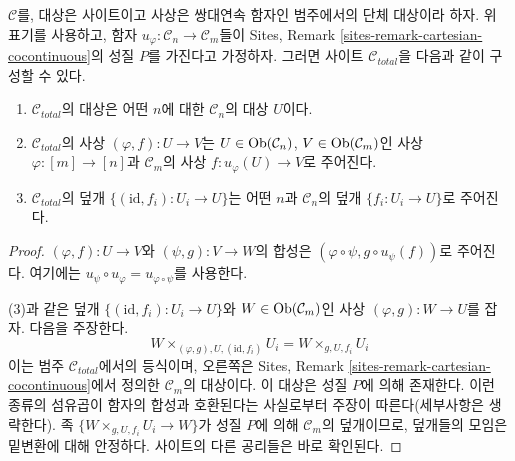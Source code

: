 \begin{lemma}
\label{lemma-simplicial-cocontinuous-site}
$\mathcal{C}$를, 대상은 사이트이고 사상은 쌍대연속 함자인 범주에서의
단체 대상이라 하자. 위 표기를 사용하고, 함자
$u_\varphi : \mathcal{C}_n \to \mathcal{C}_m$들이 Sites, Remark
\ref{sites-remark-cartesian-cocontinuous}의 성질 $P$를 가진다고 가정하자.
그러면 사이트 $\mathcal{C}_{total}$을 다음과 같이 구성할 수 있다.
\begin{enumerate}
\item $\mathcal{C}_{total}$의 대상은 어떤 $n$에 대한
$\mathcal{C}_n$의 대상 $U$이다.
\item $\mathcal{C}_{total}$의 사상
$(\varphi, f) : U \to V$는 $U \in \mathop{\mathrm{Ob}}\nolimits(\mathcal{C}_n)$,
$V \in \mathop{\mathrm{Ob}}\nolimits(\mathcal{C}_m)$인 사상 $\varphi : [m] \to [n]$과
$\mathcal{C}_m$의 사상 $f : u_\varphi(U) \to V$로 주어진다.
\item $\mathcal{C}_{total}$의 덮개
$\{(\text{id}, f_i) :  U_i \to U\}$는 어떤 $n$과
$\mathcal{C}_n$의 덮개 $\{f_i : U_i \to U\}$로 주어진다.
\end{enumerate}
\end{lemma}

\begin{proof}
$(\varphi, f) : U \to V$와 $(\psi, g) : V \to W$의 합성은
$(\varphi \circ \psi, g \circ u_\psi(f))$로 주어진다.
여기에는 $u_\psi \circ u_\varphi = u_{\varphi \circ \psi}$를 사용한다.

\medskip\noindent
(3)과 같은 덮개 $\{(\text{id}, f_i) :  U_i \to U\}$와
$W \in \mathop{\mathrm{Ob}}\nolimits(\mathcal{C}_m)$인 사상 $(\varphi, g) : W \to U$를 잡자.
다음을 주장한다.
$$
W \times_{(\varphi, g), U, (\text{id}, f_i)} U_i =
W \times_{g, U, f_i} U_i
$$
이는 범주 $\mathcal{C}_{total}$에서의 등식이며, 오른쪽은
Sites, Remark \ref{sites-remark-cartesian-cocontinuous}에서 정의한
$\mathcal{C}_m$의 대상이다. 이 대상은 성질 $P$에 의해 존재한다.
이런 종류의 섬유곱이 함자의 합성과 호환된다는 사실로부터 주장이
따른다(세부사항은 생략한다).
족 $\{W \times_{g, U, f_i} U_i \to W\}$가 성질 $P$에 의해
$\mathcal{C}_m$의 덮개이므로, 덮개들의 모임은 밑변환에 대해 안정하다.
사이트의 다른 공리들은 바로 확인된다.
\end{proof}

